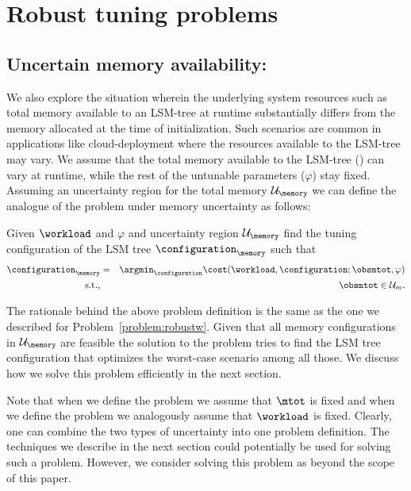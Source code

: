 
\appendix

\section{Robust tuning problems}
\subsection{Uncertain memory availability:}
We also explore the situation wherein the underlying system resources such as
    total memory available to an LSM-tree at runtime substantially differs from
    the memory allocated at the time of initialization.
Such scenarios are common in applications like cloud-deployment where the 
    resources available to the LSM-tree may vary.
We assume that the total memory available to the LSM-tree ({\mtot}) can vary
    at runtime, while the rest of the untunable parameters ($\varphi$) stay
    fixed.
Assuming an uncertainty region for the total memory $\mathcal{U}_\memory$ we can define the
analogue of the {\robustw} problem under memory uncertainty as follows:


\begin{problem}[{\robustm}]\label{problem:robustm}
Given $\workload$ and $\varphi$ and uncertainty region $\mathcal{U}_\memory$ 
find the tuning configuration of the LSM tree $\configuration_\memory$ such that
\begin{eqnarray}
\label{eq:robust_memory_problem}
\configuration_{\memory} &=& \argmin_{\configuration} \cost(\workload,
    \configuration; \obsmtot, \varphi) \nonumber\\
    \textrm{s.t.,}&& \obsmtot \in \mathcal{U}_{m}.
\end{eqnarray}
\end{problem}

The rationale behind the above problem definition is the same as the one we described for Problem~\ref{problem:robustw}.
Given that all memory configurations in $\mathcal{U}_\memory$ are feasible the solution to the {\robustm} problem tries to find
the LSM tree configuration that optimizes the worst-case scenario among all those. We discuss how we solve this problem efficiently in the next section.

Note that when we define the {\robustw} problem we assume that $\mtot$ is fixed and when we define the {\robustm} problem
we analogously assume that $\workload$ is fixed.  Clearly, one can combine the two types of uncertainty into one problem definition.  The techniques we describe in the next section could potentially be used for solving such a problem.  However, 
we consider solving this problem as beyond the scope of this paper. 

